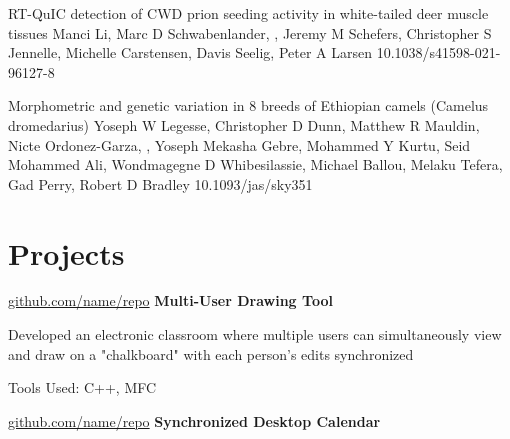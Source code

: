 \documentclass{resume}
\begin{document}
\begin{samepage}
            {RT-QuIC detection of CWD prion seeding activity in white-tailed deer muscle tissues}
            {Manci Li, Marc D Schwabenlander, \me{}, Jeremy M Schefers, Christopher S Jennelle, Michelle Carstensen, Davis Seelig, Peter A Larsen}
            {10.1038/s41598-021-96127-8}

            {Morphometric and genetic variation in 8 breeds of Ethiopian camels (Camelus dromedarius)}
            {Yoseph W Legesse, Christopher D Dunn, Matthew R Mauldin, Nicte Ordonez-Garza, \me{}, Yoseph Mekasha Gebre, Mohammed Y Kurtu, Seid Mohammed Ali, Wondmagegne D Whibesilassie, Michael Ballou, Melaku Tefera, Gad Perry, Robert D Bradley}
            {10.1093/jas/sky351}

        \end{samepage}


    
    \section{Projects}



        
        \begin{twocolentry}{
            \href{https://github.com/sinaatalay/rendercv}{github.com/name/repo}
        }
            \textbf{Multi-User Drawing Tool}\end{twocolentry}

        \vspace{0.10 cm}
        \begin{onecolentry}
            \begin{highlights}
                \item Developed an electronic classroom where multiple users can simultaneously view and draw on a "chalkboard" with each person's edits synchronized
                \item Tools Used: C++, MFC
            \end{highlights}
        \end{onecolentry}


        \vspace{0.2 cm}

        \begin{twocolentry}{
            \href{https://github.com/sinaatalay/rendercv}{github.com/name/repo}
        }
            \textbf{Synchronized Desktop Calendar}\end{twocolentry}
\end{document}
